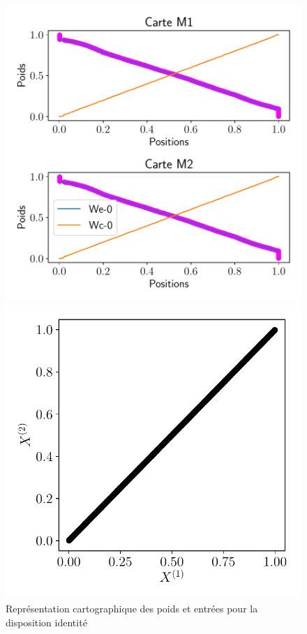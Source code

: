 \documentclass[../main]{subfiles}
\begin{document}
\begin{figure}
\begin{minipage}{0.66\textwidth}
	\includegraphics[width=\textwidth]{2som_id_w.pdf}
	\caption{Représentation cartographique des poids et entrées pour la disposition identité}
\end{minipage}
\begin{minipage}{0.33\textwidth}
	\includegraphics[width=\textwidth]{2som_id_in}
\end{minipage}
\end{figure}
\end{document}
